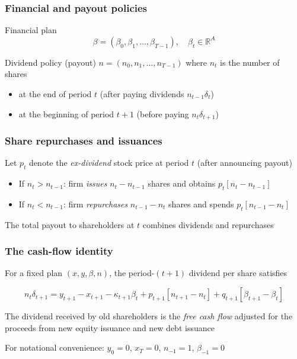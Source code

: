 \documentclass[blue]{beamer}
\def\R{\mathbb{R}}
\theoremstyle{definition}
\theoremstyle{example}
\begin{document}
\begin{frame}\frametitle{Financial and payout policies}
\begin{block}{Financial plan}
\begin{equation*}
\beta = (\beta_0, \beta_1, \ldots, \beta_{T-1}), \quad \beta_t \in \R^A
\end{equation*}
\end{block}

\begin{block}{Dividend policy (payout)}
$n = (n_0, n_1, \ldots, n_{T-1})$ where $n_t$ is the number of shares
\begin{itemize}
\item at the end of period $t$ (after paying dividends $n_{t-1} \delta_t$)
\item at the beginning of period $t+1$ (before paying $n_t \delta_{t+1}$)
\end{itemize}
\end{block}
\end{frame}

\begin{frame}\frametitle{Share repurchases and issuances}
Let $p_t$ denote the \emph{ex-dividend} stock price at period $t$ (after announcing payout)
\bigskip

\begin{itemize}
\item If $n_t > n_{t-1}$: firm \emph{issues} $n_t - n_{t-1}$ shares and obtains $p_t [n_t - n_{t-1}]$
\item If $n_t < n_{t-1}$: firm \emph{repurchases} $n_{t-1} - n_t$ shares and spends $p_t [n_{t-1} - n_t]$
\end{itemize}
\bigskip

The total payout to shareholders at $t$ combines dividends and repurchases
\end{frame}

\begin{frame}\frametitle{The cash-flow identity}
For a fixed plan $(x, y, \beta, n)$, the period-$(t+1)$ dividend per share satisfies
\begin{small}
\begin{equation*}
n_t \delta_{t+1} = y_{t+1} - x_{t+1} - \kappa_{t+1} \beta_t + p_{t+1} [n_{t+1} - n_t] + q_{t+1} [\beta_{t+1} - \beta_t]
\end{equation*}
\end{small}
\bigskip

The dividend received by old shareholders is the \emph{free cash flow} adjusted for the proceeds from new equity issuance and new debt issuance
\bigskip

For notational convenience: $y_0 = 0$, $x_T = 0$, $n_{-1} = 1$, $\beta_{-1} = 0$
\end{frame}
\end{document}
